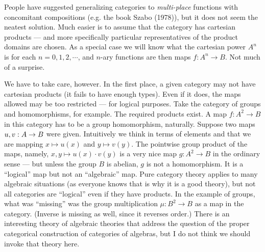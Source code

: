 People have suggested generalizing categories to {\it multi-place} functions with
concomitant compositions (e.g. the book Szabo (1978)), but it does not seem the neatest
solution. Much easier is to assume that the category has cartesian products --- and more
specifically particular representatives of the product domains are chosen. As a special
case we will know what the cartesian power $A^n$ is for each $n=0,1,2,\cdots$, and $n$-ary
functions are then maps $f: A^n\to B$. Not much of a surprise.

We have to take care, however. In the first place, a given category may not have cartesian
products (it fails to have enough types). Even if it does, the maps allowed may be too
restricted --- for logical purposes. Take the category of groups and homomorphisms, for
example. The required products exist. A map $f : A^2 \to B$ in this category has to be a
group homomorphism, naturally. Suppose two maps $u,v: A \rightarrow B$ were given. Intuitively we
think in terms of elements and that we are mapping $x \mapsto u(x)$ and $y \mapsto v(y)$.
The pointwise group product of the maps, namely, $x,y \mapsto  u(x) \cdot v(y)$ is a very
nice map $g : A^2 \to B$ in the ordinary sense --- but unless the group $B$ is abelian,
$g$ is not a homomorphism. %
It is a ``logical'' map but not an ``algebraic'' map. Pure
category theory applies to many algebraic situations (as everyone knows that is why it is
a good theory), but not all categories are ``logical'' even if they have products. In the
example of groups, what was ``missing'' was the group multiplication $\mu: B^2 \to B$ as a
map in the category. (Inverse is missing as well, since it reverses order.) There is an
interesting theory of algebraic theories that address the question of the proper
categorical construction of categories of algebras, but I do not think we should invoke
that theory here.

